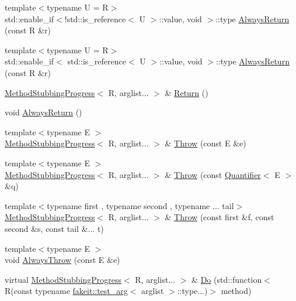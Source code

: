 \begin{DoxyCompactItemize}
{\footnotesize template$<$typename U  = R$>$ }\\std\+::enable\+\_\+if$<$!std\+::is\+\_\+reference$<$ U $>$\+::value, void $>$\+::type \mbox{\hyperlink{structfakeit_1_1MethodStubbingProgress_a268ca122b518c0a34e80535d8f457549}{Always\+Return}} (const R \&r)
\item 
{\footnotesize template$<$typename U  = R$>$ }\\std\+::enable\+\_\+if$<$ std\+::is\+\_\+reference$<$ U $>$\+::value, void $>$\+::type \mbox{\hyperlink{structfakeit_1_1MethodStubbingProgress_a84cf6a4bf307cf8d49efb69b014e9b11}{Always\+Return}} (const R \&r)
\item 
\mbox{\hyperlink{structfakeit_1_1MethodStubbingProgress}{Method\+Stubbing\+Progress}}$<$ R, arglist... $>$ \& \mbox{\hyperlink{structfakeit_1_1MethodStubbingProgress_a4743b7e25e98cd6a2be2c03b7a9416d4}{Return}} ()
\item 
void \mbox{\hyperlink{structfakeit_1_1MethodStubbingProgress_a3f1ecf87f8c73b7f3276786914579f8b}{Always\+Return}} ()
\item 
{\footnotesize template$<$typename E $>$ }\\\mbox{\hyperlink{structfakeit_1_1MethodStubbingProgress}{Method\+Stubbing\+Progress}}$<$ R, arglist... $>$ \& \mbox{\hyperlink{structfakeit_1_1MethodStubbingProgress_ae3da30d02ba5de4bfa82f51bba5602c3}{Throw}} (const E \&e)
\item 
{\footnotesize template$<$typename E $>$ }\\\mbox{\hyperlink{structfakeit_1_1MethodStubbingProgress}{Method\+Stubbing\+Progress}}$<$ R, arglist... $>$ \& \mbox{\hyperlink{structfakeit_1_1MethodStubbingProgress_a93c74210adfc0ec4662aff15f78834c7}{Throw}} (const \mbox{\hyperlink{structfakeit_1_1Quantifier}{Quantifier}}$<$ E $>$ \&q)
\item 
{\footnotesize template$<$typename first , typename second , typename ... tail$>$ }\\\mbox{\hyperlink{structfakeit_1_1MethodStubbingProgress}{Method\+Stubbing\+Progress}}$<$ R, arglist... $>$ \& \mbox{\hyperlink{structfakeit_1_1MethodStubbingProgress_a516a0ade529c61e4ab6df1bf47f3f1b2}{Throw}} (const first \&f, const second \&s, const tail \&... t)
\item 
{\footnotesize template$<$typename E $>$ }\\void \mbox{\hyperlink{structfakeit_1_1MethodStubbingProgress_a4efb736b0529123d9c5ed87630e11ac2}{Always\+Throw}} (const E \&e)
\item 
virtual \mbox{\hyperlink{structfakeit_1_1MethodStubbingProgress}{Method\+Stubbing\+Progress}}$<$ R, arglist... $>$ \& \mbox{\hyperlink{structfakeit_1_1MethodStubbingProgress_a9ef4c2db8e567aa312b708613d240ae1}{Do}} (std\+::function$<$ R(const typename \mbox{\hyperlink{structfakeit_1_1test__arg}{fakeit\+::test\+\_\+arg}}$<$ arglist $>$\+::type...)$>$ method)

\end{DoxyCompactItemize}

